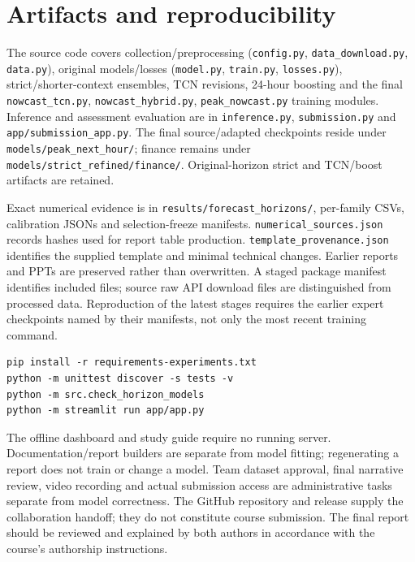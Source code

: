 \documentclass[twoside,english]{article}
\begin{document}
\section{Artifacts and reproducibility}
The source code covers collection/preprocessing (\texttt{config.py}, \texttt{data\_download.py}, \texttt{data.py}), original models/losses (\texttt{model.py}, \texttt{train.py}, \texttt{losses.py}), strict/shorter-context ensembles, TCN revisions, 24-hour boosting and the final \texttt{nowcast\_tcn.py}, \texttt{nowcast\_hybrid.py}, \texttt{peak\_nowcast.py} training modules. Inference and assessment evaluation are in \texttt{inference.py}, \texttt{submission.py} and \texttt{app/submission\_app.py}. The final source/adapted checkpoints reside under \texttt{models/peak\_next\_hour/}; finance remains under \texttt{models/strict\_refined/finance/}. Original-horizon strict and TCN/boost artifacts are retained.

Exact numerical evidence is in \texttt{results/forecast\_horizons/}, per-family CSVs, calibration JSONs and selection-freeze manifests. \texttt{numerical\_sources.json} records hashes used for report table production. \texttt{template\_provenance.json} identifies the supplied template and minimal technical changes. Earlier reports and PPTs are preserved rather than overwritten. A staged package manifest identifies included files; source raw API download files are distinguished from processed data. Reproduction of the latest stages requires the earlier expert checkpoints named by their manifests, not only the most recent training command.

\begin{verbatim}
pip install -r requirements-experiments.txt
python -m unittest discover -s tests -v
python -m src.check_horizon_models
python -m streamlit run app/app.py
\end{verbatim}
The offline dashboard and study guide require no running server. Documentation/report builders are separate from model fitting; regenerating a report does not train or change a model. Team dataset approval, final narrative review, video recording and actual submission access are administrative tasks separate from model correctness. The GitHub repository and release supply the collaboration handoff; they do not constitute course submission. The final report should be reviewed and explained by both authors in accordance with the course's authorship instructions.
\end{document}
